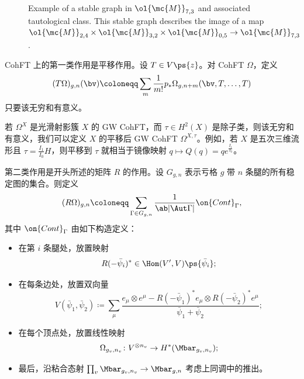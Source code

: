 \begin{figure}[htpb]
  \centering
  \caption{Example of a stable graph in $\ol{\mc{M}}_{7,3}$ and associated tautological class. This stable graph describes the image of a map
    $\ol{\mc{M}}_{2,4} \times \ol{\mc{M}}_{3,2} \times \ol{\mc{M}}_{0,5} \to \ol{\mc{M}}_{7,3}$.}
  \label{fig:stablegraph}
\end{figure}

CohFT 上的第一类作用是平移作用。设 \(T \in V\ps{z}\)。对 CohFT \(\Omega\)，定义
\[ (T\Omega)_{g,n}(\bv) \coloneqq \sum_m \frac{1}{m!} p_* \Omega_{g,n+m}(\bv, T,\ldots,T) \]
只要该无穷和有意义。

\begin{exm}
    若 \(\Omega^X\) 是光滑射影簇 \(X\) 的 GW CohFT，而 \(\tau \in H^2(X)\) 是除子类，则该无穷和有意义，我们可以定义 \(X\) 的平移后 GW CohFT \(\Omega^{X,\tau}\)。例如，若 \(X\) 是五次三维流形且 \(\tau = \frac{I_1}{I_0} H\)，则平移到 \(\tau\) 就相当于镜像映射 \(q \mapsto Q(q) = q e^{\frac{I_1}{I_0}}\)。
\end{exm}

第二类作用是开头所述的矩阵 \(R\) 的作用。设 \(G_{g,n}\) 表示亏格 \(g\) 带 \(n\) 条腿的所有稳定图的集合。则定义
\[ (R\Omega)_{g,n} \coloneqq \sum_{\Gamma \in G_{g,n}} \frac{1}{\ab|\Aut \Gamma|} \on{Cont}_{\Gamma}, \]
其中 \(\on{Cont}_{\Gamma}\) 由如下构造定义：
\begin{itemize}
    \item 在第 \(i\) 条腿处，放置映射
        \[ R(-\bar{\psi}_i)^* \in \Hom(V',V) \ps{\bar{\psi}_i}; \]
    \item 在每条边处，放置双向量
        \[ V(\bar{\psi}_1, \bar{\psi}_2) \coloneqq \sum_{\mu} \frac{e_{\mu} \otimes e^{\mu} - R(-\bar{\psi}_1)^* e_{\mu} \otimes R(-\bar{\psi}_2)^* e^{\mu}}{\bar{\psi}_1 + \bar{\psi}_2}; \]
    \item 在每个顶点处，放置线性映射
        \[ \Omega_{g_v, n_v} \colon V^{\otimes n_v} \to H^*(\Mbar_{g_v, n_v}); \]
    \item 最后，沿粘合态射 \(\prod_v \Mbar_{g_v, n_v} \to \Mbar_{g,n}\) 考虑上同调中的推出。
\end{itemize}

